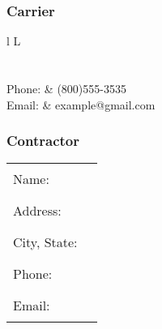 
{
    \noindent%
    \begin{minipage}{0.495\linewidth}
        \subsubsection{Carrier}
        \begin{center}
            \begin{tabularx}{\textwidth}{l L}
                           \\
                        \\
                 \\
                Phone:         & (800)555-3535  \\
                Email:         & example@gmail.com
            \end{tabularx}
        \end{center}
    \end{minipage}%
    \hfill%
    \begin{minipage}{0.495\linewidth}
        \subsubsection{Contractor}
        \begin{center}
            \begin{tabularx}{\textwidth}{l X}
                Name:        & \rule{\linewidth}{0.5pt} \\
                Address:     & \rule{\linewidth}{0.5pt} \\
                City, State: & \rule{\linewidth}{0.5pt} \\
                Phone:       & \rule{\linewidth}{0.5pt} \\
                Email:       & \rule{\linewidth}{0.5pt}
            \end{tabularx}
        \end{center}
    \end{minipage}
}
\vspace{1em}